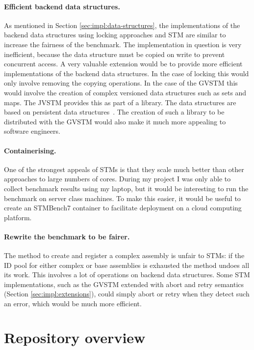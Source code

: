 \documentclass[12pt,a4paper,oneside,openright]{report}
\begin{document}
\paragraph{Efficient backend data structures.} As mentioned in Section
\ref{sec:impl:data-structures}, the implementations of the backend
data structures using locking approaches and STM are similar to
increase the fairness of the benchmark. The implementation in question
is very inefficient, because the data structure must be copied on
write to prevent concurrent access. A very valuable extension would be
to provide more efficient implementations of the backend data
structures. In the case of locking this would only involve removing
the copying operations. In the case of the GVSTM this would involve
the creation of complex versioned data structures such as sets and
maps. The JVSTM provides this as part of a library. The data
structures are based on persistent data
structures~\cite{PurelyFunctional}. The creation of such a library to
be distributed with the GVSTM would also make it much more appealing
to software engineers.

\paragraph{Containerising.} One of the strongest appeals of STMs is
that they scale much better than other approaches to large numbers of
cores. During my project I was only able to collect benchmark results
using my laptop, but it would be interesting to run the benchmark on
server class machines. To make this easier, it would be useful to
create an STMBench7 container to facilitate deployment on a cloud
computing platform.

\paragraph{Rewrite the benchmark to be fairer.} The method to create
and register a complex assembly is unfair to STMs: if the ID pool for
either complex or base assemblies is exhausted the method undoes all
its work. This involves a lot of operations on backend data
structures. Some STM implementations, such as the GVSTM extended with
abort and retry semantics (Section \ref{sec:impl:extensions}), could
simply abort or retry when they detect such an error, which would be
much more efficient.

\section{Repository overview}
\label{sec:impl:repository-overview}
\end{document}
